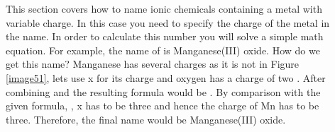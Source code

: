 \documentclass[main.tex]{subfiles}
\begin{document}
\begin{description}
\item[] This section covers how to name ionic chemicals containing a metal with variable charge. In this case you need to specify the charge of the metal in the name. In order to calculate this number you will solve a simple math equation. For example, the name of  is Manganese(III) oxide. How do we get this name? Manganese has several charges as it is not in Figure \ref{image51}, lets use x for its charge  and oxygen has a charge of two . After combining  and  the resulting formula would be  . By comparison with the given formula,  , x has to be three and hence the charge of Mn has to be three. Therefore, the final name would be Manganese(III) oxide.

\end{description}
\end{document}
